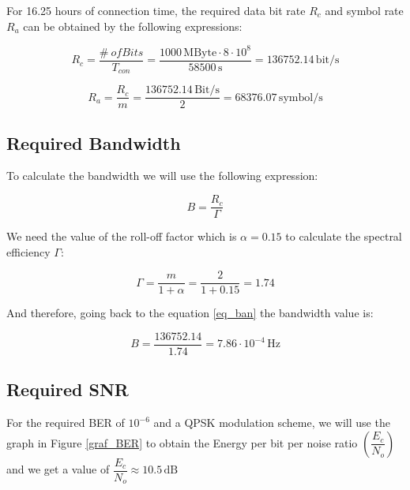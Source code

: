 \documentclass[a4paper,12pt,calibri,oneside,openany]{book}
\newcommand{\unit}[1]{\ensuremath{\, \mathrm{#1}}}
\theoremstyle{break}
\begin{document}
		For 16.25 hours of connection time, the required data bit rate $R_{c}$ and symbol rate $R_{a}$ can be obtained by the following expressions:
		
		\begin{equation} \label{eq_rc}
			R_{c}= \dfrac{\# \ of Bits}{T_{con}} = \dfrac{1000 \unit{MByte} \cdot 8 \cdot 10^{8}}{58500 \unit{s}}= 136752.14 \unit{bit/s} 
		\end{equation}
	
		\begin{equation} \label{eq_ra}
			R_{a}= \dfrac{R_{c}}{m} = \dfrac{136752.14 \unit{Bit/s}}{2}= 68376.07 \unit{symbol/s} 
		\end{equation}
	
	\subsection{Required Bandwidth}	
	
		To calculate the bandwidth we will use the following expression:
		
		\begin{equation} \label{eq_ban}
			B= \dfrac{R_{c}}{\Gamma} 
		\end{equation}
	
		We need the value of the roll-off factor which is $\alpha=0.15$ to calculate the spectral efficiency $\Gamma$:
		
		\begin{equation} \label{eq_espectral_eff}
			\Gamma= \dfrac{m}{1+\alpha} = \dfrac{2}{1+0.15} =  1.74
		\end{equation}
		
		And therefore, going back to the equation \ref{eq_ban} the bandwidth value is:
		
		\begin{equation} \label{eq_ban2}
			B= \dfrac{136752.14}{1.74} = 7.86 \cdot 10^{-4} \unit{Hz}
		\end{equation}
	
	\subsection{Required SNR}
	
		For the required BER of $10^{-6}$ and a QPSK modulation scheme, we will use the graph in Figure \ref{graf_BER} to obtain the Energy per bit per noise ratio $\left(\dfrac{E_{c}}{N_{o}}\right)$ and we get a value of $\dfrac{E_{c}}{N_{o}}\approx10.5 \unit{dB}$
	
\end{document}
